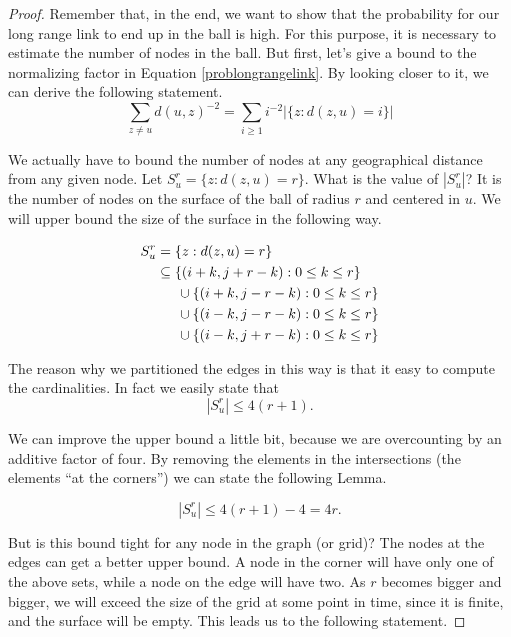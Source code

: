 \begin{proof}
Remember that, in the end, we want to show that the probability for our long range link to end up in the ball is high. For this purpose, it is necessary to estimate the number of nodes in the ball. But first, let's give a bound to the normalizing factor in Equation \ref{problongrangelink}. By looking closer to it, we can derive the following statement.
\begin{equation}\label{longrangenormfact}
\sum_{z \neq u}d(u, z)^{-2} = \sum_{i \geq 1} i^{-2} |\{z : d(z, u) = i\}|
\end{equation}

We actually have to bound the number of nodes at any geographical distance from any given node. Let $S_u^r = \{z : d(z, u) = r\}$. What is the value of $|S_u^r|$? It is the number of nodes on the surface of the ball of radius $r$ and centered in $u$. We will upper bound the size of the surface in the following way.

\begin{align}
S_u^r &= \{z : d(z, u) = r\}\\
& \subseteq \{(i + k, j + r -k) : 0\leq k \leq r\}\\
& \indent\cup \{(i + k, j - r -k) : 0\leq k \leq r\}\\
& \indent\cup \{(i - k, j - r -k) : 0\leq k \leq r\}\\
&\indent\cup \{(i - k, j + r -k) : 0\leq k \leq r\}
\end{align}

The reason why we partitioned the edges in this way is that it easy to compute the cardinalities. In fact we easily state that 
\begin{equation}
|S_u^r| \leq 4(r + 1).
\end{equation}

We can improve the upper bound a little bit, because we are overcounting by an additive factor of four. By removing the elements in the intersections (the elements ``at the corners'') we can state the following Lemma.

\begin{lem}\label{lem:swp_surface_ub}
\begin{equation}
|S_u^r| \leq 4(r +1) - 4 = 4r.
\end{equation}
\end{lem}

But is this bound tight for any node in the graph (or grid)? The nodes at the edges can get a better upper bound. A node in the corner will have only one of the above sets, while a node on the edge will have two. As $r$ becomes bigger and bigger, we will exceed the size of the grid at some point in time, since it is finite, and the surface will be empty. This leads us to the following statement.


\end{proof}
